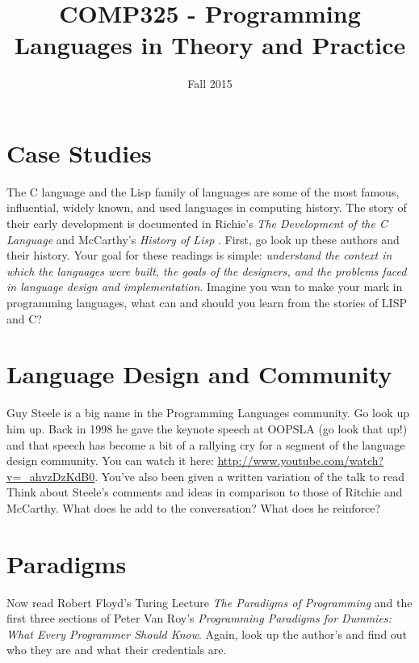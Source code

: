 \documentclass[10pt]{article}
\title{COMP325 - Programming Languages in Theory and Practice}
\author{  }
\date{Fall 2015}
\begin{document}
\maketitle

\section{Case Studies}

The C language and the Lisp family of languages are some of the most famous, influential, widely known, and used languages in computing history.  The story of their early development is documented in Richie's \textit{The Development of the C Language} \citep{ritchiedevelopment} and McCarthy's \textit{History of Lisp} \citep{mccarthyhistory}.  First, go look up these authors and their history.   Your goal for these readings is simple: \textit{understand the context in which the languages were built, the goals of the designers, and the problems faced in language design and implementation}. Imagine you wan to make your mark in programming languages, what can and should you learn from the stories of LISP and C? 

\section{Language Design and Community}

Guy Steele is a big name in the Programming Languages community.  Go look up him up.  Back in 1998 he gave the keynote speech at OOPSLA (go look that up!) and that speech has become a bit of a rallying cry for a segment of the language design community.  You can watch it here: \url{http://www.youtube.com/watch?v=_ahvzDzKdB0}. You've also been given a written variation of the talk to read\citep{steelegrowing} Think about Steele's comments and ideas in comparison to those of Ritchie and McCarthy. What does he add to the conversation? What does he reinforce? 


\section{Paradigms}

Now read Robert Floyd's Turing Lecture \textit{The Paradigms of Programming}\citep{floydparadigms} and the first three sections of Peter Van Roy's \textit{Programming Paradigms for Dummies: What Every Programmer Should Know}\citep{vanroyprogramming}.  Again, look up the author's and find out who they are and what their credentials are.  
\end{document}
